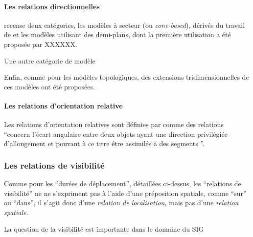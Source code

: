 \paragraph{Les relations directionnelles}


\textcite{Frank,} recense deux catégories, les modèles à secteur (ou
\emph{cone-based}), dérivés du travail de \textcite{Peuquet1987} et
les modèles utilisant des demi-plans, dont la première utilisation a
été proposée par XXXXXX.






%
Une autre catégorie de modèle 




Enfin, comme pour les modèles topologiques, des extensions
tridimensionnelles de ces modèles ont été proposées.



\paragraph{Les relations d'orientation relative}

Les relations d'orientation relatives sont définies par
\textcite{Duchene2019} comme des relations
\enquote{concern l'écart angulaire entre deux objets
  ayant une direction privilégiée d'allongement et pouvant à ce titre
  être assimilés à des segments \textelp{}}.







\subsubsection{Les relations de visibilité}

Comme pour les \enquote{durées de déplacement}, détaillées ci-dessus,
les \enquote{relations de visibilité} ne ne s'expriment pas à l'aide
d'une préposition spatiale, comme \enquote{sur} ou \enquote{dans}, il
s'agit donc d'une \emph{relation de localisation,} mais pas d'une
\emph{relation spatiale.}

La question de la visibilité est importante dans le domaine du SIG






